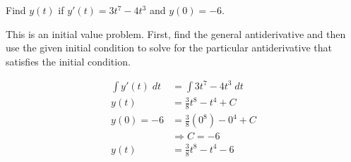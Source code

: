 \documentclass{ximera}
\author{Emma Smith Zbarsky}
\begin{document}
\begin{exercise}

Find $y(t)$ if $y'(t) = 3t^7-4t^3$ and $y(0)=-6$.


\begin{hint}
This is an initial value problem. First, find the general antiderivative
and then use the given initial condition to solve for the particular
antiderivative that satisfies the initial condition.
\end{hint}


\begin{hint}
\begin{align*}
\int y'(t)\; dt &= \int 3t^7-4t^3\; dt \\
y(t) &= \frac{3}{8}t^8-t^4+C \\
y(0) = -6 &= \frac{3}{8}(0^8)-0^4+C \\
& \Rightarrow C=-6 \\
y(t) &= \frac{3}{8}t^8-t^4-6 
\end{align*}
\end{hint}


\begin{multipleChoice}
\end{multipleChoice}

\end{exercise}
\end{document}
